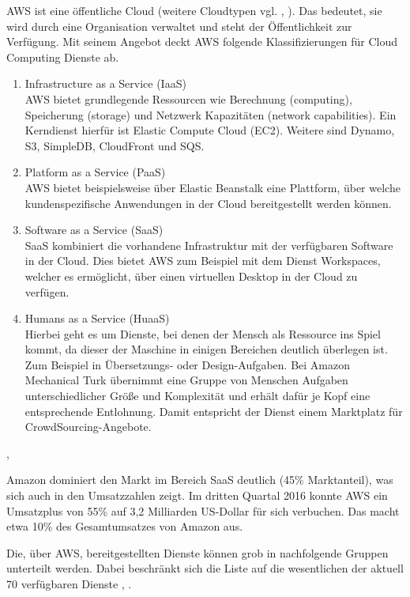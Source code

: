 AWS ist eine öffentliche Cloud (weitere Cloudtypen vgl. \cite{wittig:awsinaction}, \cite{baun:cloudcomp}). Das bedeutet, sie wird durch eine Organisation verwaltet und steht der Öffentlichkeit zur Verfügung. Mit seinem Angebot deckt AWS folgende Klassifizierungen für Cloud Computing Dienste ab.
\begin{enumerate}
  \item Infrastructure as a Service (IaaS)
  \\AWS bietet grundlegende Ressourcen wie Berechnung (computing), Speicherung (storage) und Netzwerk Kapazitäten (network capabilities). Ein Kerndienst hierfür ist Elastic Compute Cloud (EC2). Weitere sind Dynamo, S3, SimpleDB, CloudFront und SQS.
  \item Platform as a Service (PaaS)
  \\AWS bietet beispielsweise über Elastic Beanstalk eine Plattform, über welche kundenspezifische Anwendungen in der Cloud bereitgestellt werden können.
  \item Software as a Service (SaaS)
  \\SaaS kombiniert die vorhandene Infrastruktur mit der verfügbaren Software in der Cloud. Dies bietet AWS zum Beispiel mit dem Dienst Workspaces, welcher es ermöglicht, über einen virtuellen Desktop in der Cloud zu verfügen.
  \item Humans as a Service (HuaaS)
  \\ Hierbei geht es um Dienste, bei denen der Mensch als Ressource ins Spiel kommt, da dieser der Maschine in einigen Bereichen deutlich überlegen ist. Zum Beispiel in Übersetzungs- oder Design-Aufgaben. Bei Amazon Mechanical Turk übernimmt eine Gruppe von Menschen Aufgaben unterschiedlicher Größe und Komplexität und erhält dafür je Kopf eine entsprechende Entlohnung. Damit entspricht der Dienst einem Marktplatz für CrowdSourcing-Angebote.
\end{enumerate} \cite{wittig:awsinaction}, \cite{baun:cloudcomp}

Amazon dominiert den Markt im Bereich SaaS deutlich (45\% Marktanteil), was sich auch in den Umsatzzahlen zeigt. Im dritten Quartal 2016 konnte AWS ein Umsatzplus von 55\% auf 3,2 Milliarden US-Dollar für sich verbuchen. Das macht etwa 10\% des Gesamtumsatzes von Amazon aus. \cite{t3n:brien}

Die, über AWS, bereitgestellten Dienste können grob in nachfolgende Gruppen unterteilt werden. Dabei beschränkt sich die Liste auf die wesentlichen der aktuell 70 verfügbaren Dienste \cite{sendcheckit:plain}, \cite{aws:insider}.

